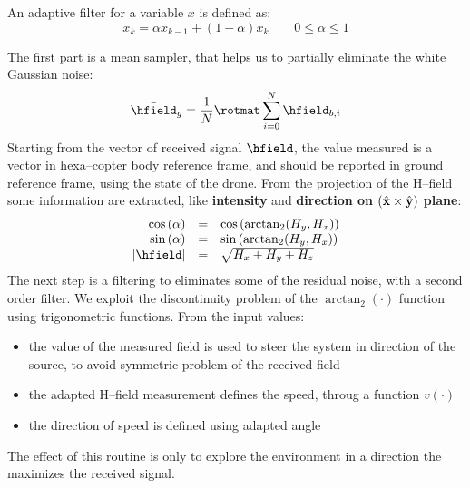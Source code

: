 An adaptive filter for a variable $x$ is defined as:
\[
x_k = \alpha x_{k-1} + (1-\alpha) \bar{x}_k \qquad 0 \leq \alpha \leq 1
\]

The first part is a mean sampler, that helps us to partially eliminate the white Gaussian noise:
\begin{equation}
	\bar{\hfield}_g = \dfrac{1}{N} \rotmat \sum\limits_{i=0}^{N} \hfield_{b,i}
\end{equation}
Starting from the vector of received signal $\hfield$, the value measured is a vector in hexa--copter body reference frame, and should be reported in ground reference frame, using the state of the drone. From the projection of the H--field some information are extracted, like \textbf{intensity} and \textbf{direction on} $(\hat{\mathbf{x}}\times\hat{\mathbf{y}})$ \textbf{plane}:
\begin{equation}
\begin{array}{rcl}
	\ccos{\alpha} & = & \ccos{\arctan_2(H_y,H_x)} \\
	\ssin{\alpha} & = & \ssin{\arctan_2(H_y,H_x)} \\
	\abs{\hfield} & = & \sqrt{H_x+H_y+H_z}
\end{array}
\end{equation}
The next step is a filtering to eliminates some of the residual noise, with a second order filter. We exploit the discontinuity problem of the ${\arctan_2(\cdot)}$ function using trigonometric functions. From the input values:
\begin{itemize}
\item the value of the measured field is used to steer the system in direction of the source, to avoid symmetric problem of the received field
\item the adapted H--field measurement defines the speed, throug a function ${v(\cdot)}$
\item the direction of speed is defined using adapted angle
\end{itemize}
The effect of this routine is only to explore the environment in a direction the maximizes the received signal.


